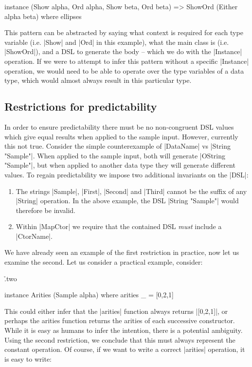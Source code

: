 \documentclass[preprint,draft]{sigplanconf}
\begin{document}
\ignore\begin{code}
instance (Show alpha, Ord alpha, Show beta, Ord beta) =>
    ShowOrd (Either alpha beta) where ellipses
\end{code}

This pattern can be abstracted by saying what context is required for each type variable (i.e. |Show| and |Ord| in this example), what the main class is (i.e. |ShowOrd|), and a DSL to generate the body -- which we do with the |Instance| operation. If we were to attempt to infer this pattern without a specific |Instance| operation, we would need to be able to operate over the type variables of a data type, which would almost always result in this particular type.

\subsection{Restrictions for predictability}
\label{sec:predictability}

In order to ensure predictability there must be no non-congruent DSL values which give equal results when applied to the sample input. However, currently this not true. Consider the simple counterexample of |DataName| vs |String "Sample"|. When applied to the sample input, both will generate |OString "Sample"|, but when applied to another data  type they will generate different values. To regain predictability we impose two additional invariants on the |DSL|:

\begin{enumerate}
\item The strings |Sample|, |First|, |Second| and |Third| cannot be the suffix of any |String| operation. In the above example, the DSL |String "Sample"| would therefore be invalid.
\item Within |MapCtor| we require that the contained DSL \textit{must} include a |CtorName|.
\end{enumerate}

We have already seen an example of the first restriction in practice, now let us examine the second. Let us consider a practical example, consider:

\h{.two}\begin{code}
instance Arities (Sample alpha) where
    arities _ = [0,2,1]
\end{code}

This could either infer that the |arities| function always returns |[0,2,1]|, or perhaps the arities function returns the arities of each successive constructor. While it is easy as humans to infer the intention, there is a potential ambiguity. Using the second restriction, we conclude that this must always represent the constant operation. Of course, if we want to write a correct |arities| operation, it is easy to write:
\end{document}
